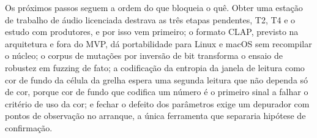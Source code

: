 \documentclass[11pt,a4paper]{article}
\begin{document}
Os próximos passos seguem a ordem do que bloqueia o quê. Obter uma estação de trabalho de áudio licenciada destrava as três etapas pendentes, T2, T4 e o estudo com produtores, e por isso vem primeiro; o formato CLAP, previsto na arquitetura e fora do MVP, dá portabilidade para Linux e macOS sem recompilar o núcleo; o corpus de mutações por inversão de bit transforma o ensaio de robustez em fuzzing de fato; a codificação da entropia da janela de leitura como cor de fundo da célula da grelha espera uma segunda leitura que não dependa só de cor, porque cor de fundo que codifica um número é o primeiro sinal a falhar o critério de uso da cor; e fechar o defeito dos parâmetros exige um depurador com pontos de observação no arranque, a única ferramenta que separaria hipótese de confirmação.



\begingroup
\small
\setlength{\parskip}{0pt}


\endgroup
\end{document}
